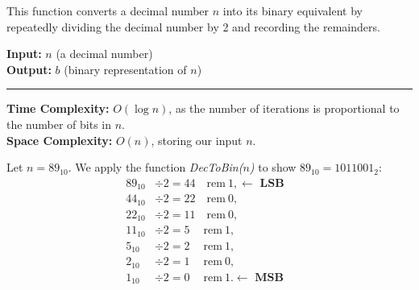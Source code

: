 \newpage
\begin{Func}

    \vspace{-.5em}
    This function converts a decimal number $n$ into its binary equivalent by repeatedly dividing the decimal number by 2 and recording the remainders.

    \vspace{.5em}
    \noindent
    \textbf{Input:} $n$ (a decimal number)\\
    \textbf{Output:} $b$ (binary representation of $n$)\\

    \begin{algorithm}[H]
        \SetAlgoLined
    \end{algorithm}
    \noindent\rule{\textwidth}{0.4pt}
    
    \noindent
    \textbf{Time Complexity:} $O(\log n)$, as the number of iterations is proportional to the number of bits in $n$.\\
    \textbf{Space Complexity:} $O(n)$, storing our input $n$.
\end{Func}

\noindent

\begin{Example}

    \vspace{-1em}
    Let $n = 89_{10}$. We apply the function \textit{DecToBin($n$)} to show $89_{10} = 1011001_2$:
\begin{align*}
    89_{10} &\div 2 = 44 \quad \text{rem} \ 1, \longleftarrow \textbf{ LSB}&   \\
    44_{10} &\div 2 = 22 \quad \text{rem} \ 0,& \\
    22_{10} &\div 2 = 11 \quad \text{rem} \ 0,& \\
    11_{10} &\div 2 = 5 \quad \ \text{rem} \ 1,& \\
    5_{10} &\div 2 = 2 \quad \ \text{rem} \ 1,& \\
    2_{10} &\div 2 = 1 \quad \ \text{rem} \ 0,& \\
    1_{10} &\div 2 = 0 \quad \ \text{rem} \ 1.  \longleftarrow \textbf{ MSB} &  
\end{align*}

\vspace{-2em}
\end{Example}

